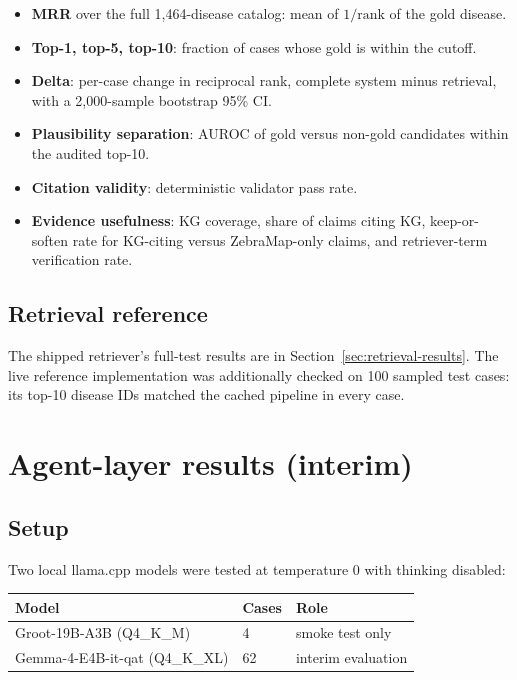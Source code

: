 \documentclass[11pt,a4paper]{article}
\begin{document}
\begin{itemize}[leftmargin=1.4em]
\item \textbf{MRR} over the full 1,464-disease catalog: mean of $1/\mathrm{rank}$
of the gold disease.
\item \textbf{Top-1, top-5, top-10}: fraction of cases whose gold is within the
cutoff.
\item \textbf{Delta}: per-case change in reciprocal rank, complete system minus
retrieval, with a 2,000-sample bootstrap 95\% CI.
\item \textbf{Plausibility separation}: AUROC of gold versus non-gold candidates
within the audited top-10.
\item \textbf{Citation validity}: deterministic validator pass rate.
\item \textbf{Evidence usefulness}: KG coverage, share of claims citing KG,
keep-or-soften rate for KG-citing versus ZebraMap-only claims, and retriever-term
verification rate.
\end{itemize}

\subsection{Retrieval reference}

The shipped retriever's full-test results are in Section~\ref{sec:retrieval-results}.
The live reference implementation was additionally checked on 100 sampled test
cases: its top-10 disease IDs matched the cached pipeline in every case.

\section{Agent-layer results (interim)}
\label{sec:agent-results}

\subsection{Setup}

Two local llama.cpp models were tested at temperature 0 with thinking disabled:

\begin{center}
\begin{tabular}{lll}
\toprule
Model & Cases & Role\\
\midrule
Groot-19B-A3B (Q4\_K\_M) & 4 & smoke test only\\
Gemma-4-E4B-it-qat (Q4\_K\_XL) & 62 & interim evaluation\\
\bottomrule
\end{tabular}
\end{center}
\end{document}
